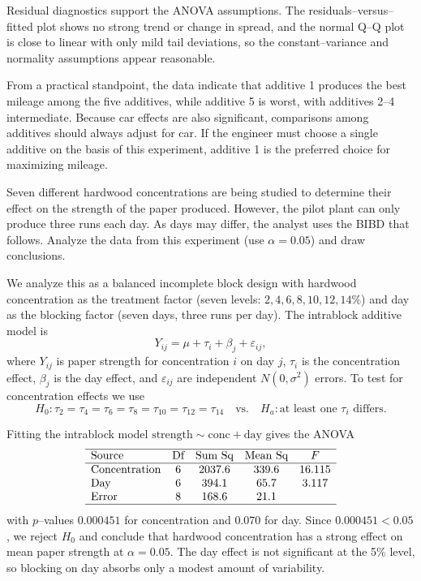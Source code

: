 \documentclass[answers,12pt,addpoints]{exam}
\begin{document}
\begin{questions}
\begin{solution}
Residual diagnostics support the ANOVA assumptions. The residuals–versus–fitted
plot shows no strong trend or change in spread, and the normal Q–Q plot is close
to linear with only mild tail deviations, so the constant–variance and normality
assumptions appear reasonable.

From a practical standpoint, the data indicate that additive 1 produces the best
mileage among the five additives, while additive 5 is worst, with additives 2–4
intermediate. Because car effects are also significant, comparisons among additives
should always adjust for car. If the engineer must choose a single additive on the
basis of this experiment, additive 1 is the preferred choice for maximizing mileage.
\end{solution}

 Seven different hardwood concentrations are being studied to
determine their effect on the strength of the paper produced. However, the pilot
plant can only produce three runs each day. As days may differ, the analyst uses
the BIBD that follows. Analyze the data from this experiment (use $\alpha = 0.05$)
and draw conclusions.


\begin{solution}
We analyze this as a balanced incomplete block design with hardwood concentration
as the treatment factor (seven levels: $2,4,6,8,10,12,14\%$) and day as the blocking
factor (seven days, three runs per day). The intrablock additive model is
\[
Y_{ij} = \mu + \tau_i + \beta_j + \varepsilon_{ij},
\]
where $Y_{ij}$ is paper strength for concentration $i$ on day $j$, $\tau_i$ is the
concentration effect, $\beta_j$ is the day effect, and $\varepsilon_{ij}$ are
independent $N(0,\sigma^2)$ errors. To test for concentration effects we use
\[
H_0:\tau_2 = \tau_4 = \tau_6 = \tau_8 = \tau_{10} = \tau_{12} = \tau_{14}
\quad\text{vs.}\quad
H_a:\text{at least one }\tau_i\text{ differs}.
\]

Fitting the intrablock model $\text{strength} \sim \text{conc} + \text{day}$ gives the
ANOVA
\[
\begin{array}{lcccc}
\hline
\text{Source}       & \text{Df} & \text{Sum Sq} & \text{Mean Sq} & F \\ \hline
\text{Concentration} & 6 & 2037.6 & 339.6 & 16.115 \\
\text{Day}           & 6 &  394.1 &  65.7 &  3.117 \\
\text{Error}         & 8 &  168.6 &  21.1 &       \\
\hline
\end{array}
\]
with $p$–values $0.000451$ for concentration and $0.070$ for day. Since
$0.000451 < 0.05$, we reject $H_0$ and conclude that hardwood concentration has a
strong effect on mean paper strength at $\alpha = 0.05$. The day effect is not
significant at the 5\% level, so blocking on day absorbs only a modest amount of
variability.


\end{solution}
\end{questions}
\end{document}

